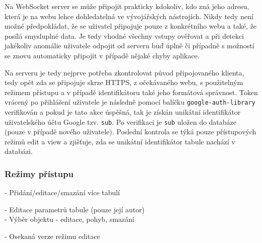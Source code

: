 Na WebSocket server se může připojit prakticky kdokoliv, kdo zná jeho adresu, která je na webu lehce dohledatelná ve vývojářských nástrojích.
Nikdy tedy není možné předpokládat, že se uživatel připojuje pouze z konkrétního webu a také, že posílá smysluplné data.
Je tedy vhodné všechny vstupy ověřovat a při detekci jakékoliv anomálie uživatele odpojit od serveru buď úplně či případně s možností se znovu automaticky připojit v případě nějaké chyby aplikace.
\begin{sloppypar*}
Na serveru je tedy nejprve potřeba zkontrolovat původ připojovaného klienta, tedy opět zda se připojuje skrze HTTPS, z očekávaného webu, s použitelným režimem přístupu a v případě identifikátoru také jeho formátová správnost.
Token vrácený po přihlášení uživatele je následně pomocí balíčku \texttt{google-auth-library} verifikován a pokud je tato akce úspěšná, tak je získán unikátní identifikátor uživatelského účtu Google tzv. \texttt{sub}.
Po verifikaci je \texttt{sub} uložen do databáze (pouze v případě nového uživatele).
Poslední kontrola se týká pouze přístupových režimů edit a view a zjišťuje, zda se unikátní identifikátor tabule nachází v databázi.
\end{sloppypar*}


\subsubsection{Režimy přístupu}
- Přidání/editace/smazání více tabulí

- Editace parametrů tabule (pouze její autor)\\
- Výběr objektu - editace, pohyb, smazání

- Osekaná verze režimu editace



